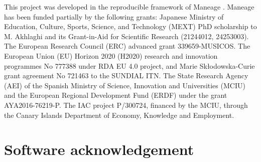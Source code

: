 \documentclass[10pt, twocolumn]{article}
\begin{document}
This project was developed in the reproducible framework of Maneage \citep[\emph{Man}aging data lin\emph{eage},][latest Maneage commit of \maneageversion, and built on an {\machinearchitecture} machine with {\machinebyteorder} byte-order]{maneage}.
Maneage has been funded partially by the following grants: Japanese Ministry of Education, Culture, Sports, Science, and Technology (MEXT) PhD scholarship to M. Akhlaghi and its Grant-in-Aid for Scientific Research (21244012, 24253003).
The European Research Council (ERC) advanced grant 339659-MUSICOS.
The European Union (EU) Horizon 2020 (H2020) research and innovation programmes No 777388 under RDA EU 4.0 project, and Marie Sk\l{}odowska-Curie grant agreement No 721463 to the SUNDIAL ITN.
The State Research Agency (AEI) of the Spanish Ministry of Science, Innovation and Universities (MCIU) and the European Regional Development Fund (ERDF) under the grant AYA2016-76219-P.
The IAC project P/300724, financed by the MCIU, through the Canary Islands Department of Economy, Knowledge and Employment.

\printbibliography

\appendix

\section{Software acknowledgement}


\end{document}
